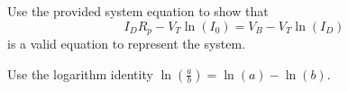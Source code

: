         \begin{enumerate}

            \qitem    Use the provided system equation to show that
                \begin{equation}
                    I_D R_p - V_T \ln(I_0) = V_B - V_T \ln(I_D)
                \end{equation}
                    is a valid equation to represent the system.
                \begin{hint}
                    Use the logarithm identity $\ln(\frac{a}{b}) = \ln(a) - \ln(b)$.
                \end{hint}
            
    
    
    
    

\end{enumerate}

